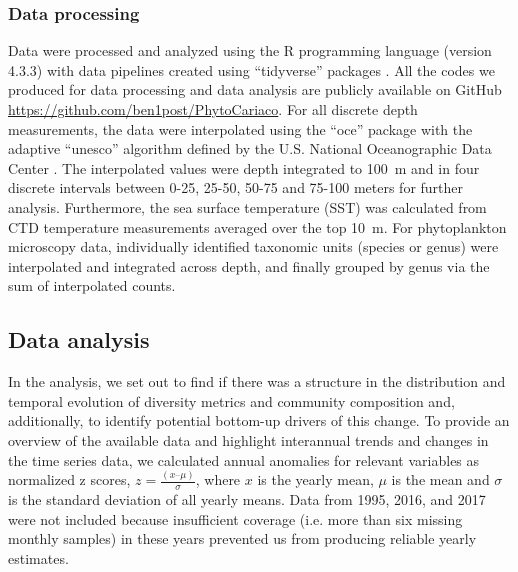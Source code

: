 \documentclass[draft]{agujournal2019}
\begin{document}
    \subsubsection{Data processing}
    Data were processed and analyzed using the R programming language (version 4.3.3) \cite{r_core_team_r_2024} with data pipelines created using ``tidyverse'' packages \cite{wickham_welcome_2019}. All the codes we produced for data processing and data analysis are publicly available on GitHub \url{https://github.com/ben1post/PhytoCariaco}.
    For all discrete depth measurements, the data were interpolated using the ``oce'' package \cite{kelley_oce_2023} with the adaptive ``unesco'' algorithm defined by the U.S. National Oceanographic Data Center \cite{johnson2006world}. The interpolated values were depth integrated to \qty{100}{\meter} and in four discrete intervals between 0-25, 25-50, 50-75 and 75-100 meters for further analysis. Furthermore, the sea surface temperature (SST) was calculated from CTD temperature measurements averaged over the top \qty{10}{\meter}. For phytoplankton microscopy data, individually identified taxonomic units (species or genus) were interpolated and integrated across depth, and finally grouped by genus via the sum of interpolated counts.


\subsection{Data analysis}    
    In the analysis, we set out to find if there was a structure in the distribution and temporal evolution of diversity metrics and community composition and, additionally, to identify potential bottom-up drivers of this change. 
    To provide an overview of the available data and highlight interannual trends and changes in the time series data, we calculated annual anomalies for relevant variables as normalized z scores, $z = \frac{(x – \mu)}{\sigma}$, where $x$ is the yearly mean, $\mu$ is the mean and $\sigma$ is the standard deviation of all yearly means. Data from 1995, 2016, and 2017 were not included because insufficient coverage (i.e. more than six missing monthly samples) in these years prevented us from producing reliable yearly estimates. 
    
\end{document}
